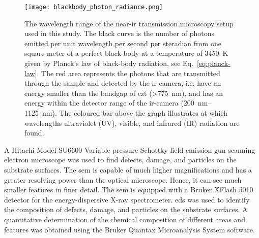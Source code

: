 \begin{figure}[htbp]
    \centering
    \texttt{[image: blackbody\_photon\_radiance.png]}
    \caption[Graph showing the wavelength range of the near-\ac{ir} transmission microscopy setup.]{The wavelength range of the near-\ac{ir} transmission microscopy setup used in this study. The black curve is the number of photons emitted per unit wavelength per second per steradian from one square meter of a perfect black-body at a temperature of \SI{3450}{\kelvin} given by Planck's law of black-body radiation, see Eq.~\eqref{eq:planck-law}. The red area represents the photons that are transmitted through the sample and detected by the \ac{ir} camera, i.e. have an energy smaller than the bandgap of \ac{czt} (\SI{>775}{\nano\metre}),  and has an energy within the detector range of the \ac{ir}-camera (\SIrange{200}{1125}{\nano\metre}). The coloured bar above the graph illustrates at which wavelengths ultraviolet (UV), visible, and infrared (IR) radiation are found.}
    \label{fig:ir-range}
\end{figure}

A Hitachi Model SU6600 Variable pressure Schottky field emission gun scanning electron microscope was used to find defects, damage, and particles on the substrate surfaces. The \ac{sem} is capable of much higher magnifications and has a greater resolving power than the optical microscope. Hence, it can see much smaller features in finer detail. The \ac{sem} is equipped with a Bruker XFlash 5010 detector for the energy-dispersive X-ray spectrometer. \Ac{eds} was used to identify the composition of defects, damage, and particles on the substrate surfaces. A quantitative determination of the chemical composition of different areas and features was obtained using the Bruker Quantax Microanalysis System software.


